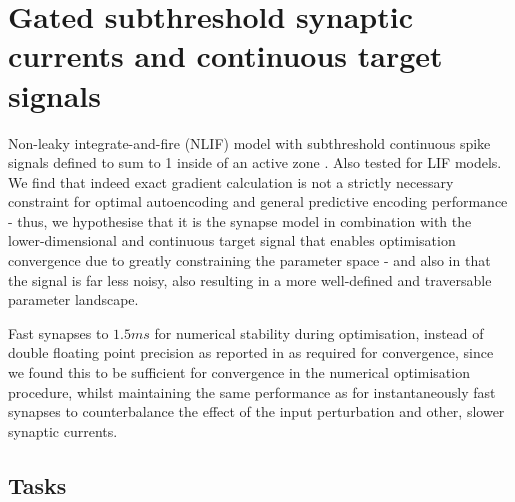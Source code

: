 \documentclass[mphil,deptreport,ianc]{infthesis} %
\begin{document}
\chapter{Gated subthreshold synaptic currents and continuous target signals}

Non-leaky integrate-and-fire (NLIF) model with subthreshold continuous spike signals defined to sum to 1 inside of an active zone \cite{Huh2017}.
Also tested for LIF models.
We find that indeed exact gradient calculation is not a strictly necessary constraint for optimal autoencoding and general predictive encoding performance - thus, we hypothesise that it is the synapse model in combination with the lower-dimensional and continuous target signal that enables optimisation convergence due to greatly constraining the parameter space - and also in that the signal is far less noisy, also resulting in a more well-defined and traversable parameter landscape.

Fast synapses to $1.5 \si{ms}$ for numerical stability during optimisation, instead of double floating point precision as reported in \cite{Huh2017} as required for convergence, since we found this to be sufficient for convergence in the numerical optimisation procedure, whilst maintaining the same performance as for instantaneously fast synapses to counterbalance the effect of the input perturbation and other, slower synaptic currents.


\section{Tasks}
\end{document}
